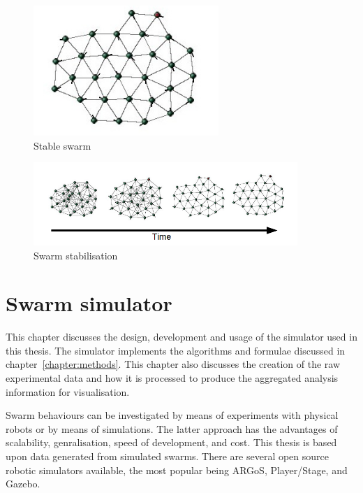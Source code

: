 \begin{figure}[H]
\begin{center}
\includegraphics[width=7cm]{CHAPTER-2/figures/Stable}
\end{center}
\caption{Stable swarm\label{methods:Stable1}}
\end{figure}

\begin{figure}[H]
\begin{center}
\includegraphics[width=10cm]{CHAPTER-2/figures/StableTime}
\end{center}
\caption{Swarm stabilisation\label{methods:StableTime1}}
\end{figure}

\section{Swarm simulator}\label{chapter:simulator}
This chapter discusses the design, development and usage of the simulator used in this thesis. The simulator implements the algorithms and formulae discussed in chapter~\ref{chapter:methods}. This chapter also discusses the creation of the raw experimental data and how it is processed to produce the aggregated analysis information for visualisation.

Swarm behaviours can be investigated by means of experiments with physical robots or by means of simulations. The latter approach has the advantages of scalability, genralisation, speed of development, and cost. This thesis is based upon data generated from simulated swarms. There are several open source robotic simulators available, the most popular being ARGoS, Player/Stage, and Gazebo.

